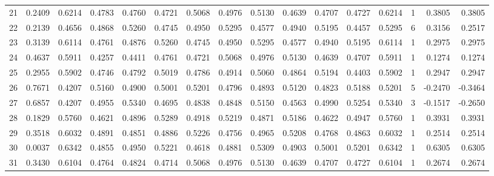 \begin{tabular}{lrrrrrrrrrrrrrrr}
21  &      0.2409 &  0.6214 &  0.4783 &  0.4760 &  0.4721 &  0.5068 &  0.4976 &  0.5130 &  0.4639 &  0.4707 &   0.4727 &     0.6214 &      1 &                    0.3805 &                     0.3805 \\
22  &      0.2139 &  0.4656 &  0.4868 &  0.5260 &  0.4745 &  0.4950 &  0.5295 &  0.4577 &  0.4940 &  0.5195 &   0.4457 &     0.5295 &      6 &                    0.3156 &                     0.2517 \\
23  &      0.3139 &  0.6114 &  0.4761 &  0.4876 &  0.5260 &  0.4745 &  0.4950 &  0.5295 &  0.4577 &  0.4940 &   0.5195 &     0.6114 &      1 &                    0.2975 &                     0.2975 \\
24  &      0.4637 &  0.5911 &  0.4257 &  0.4411 &  0.4761 &  0.4721 &  0.5068 &  0.4976 &  0.5130 &  0.4639 &   0.4707 &     0.5911 &      1 &                    0.1274 &                     0.1274 \\
25  &      0.2955 &  0.5902 &  0.4746 &  0.4792 &  0.5019 &  0.4786 &  0.4914 &  0.5060 &  0.4864 &  0.5194 &   0.4403 &     0.5902 &      1 &                    0.2947 &                     0.2947 \\
26  &      0.7671 &  0.4207 &  0.5160 &  0.4900 &  0.5001 &  0.5201 &  0.4796 &  0.4893 &  0.5120 &  0.4823 &   0.5188 &     0.5201 &      5 &                   -0.2470 &                    -0.3464 \\
27  &      0.6857 &  0.4207 &  0.4955 &  0.5340 &  0.4695 &  0.4838 &  0.4848 &  0.5150 &  0.4563 &  0.4990 &   0.5254 &     0.5340 &      3 &                   -0.1517 &                    -0.2650 \\
28  &      0.1829 &  0.5760 &  0.4621 &  0.4896 &  0.5289 &  0.4918 &  0.5219 &  0.4871 &  0.5186 &  0.4622 &   0.4947 &     0.5760 &      1 &                    0.3931 &                     0.3931 \\
29  &      0.3518 &  0.6032 &  0.4891 &  0.4851 &  0.4886 &  0.5226 &  0.4756 &  0.4965 &  0.5208 &  0.4768 &   0.4863 &     0.6032 &      1 &                    0.2514 &                     0.2514 \\
30  &      0.0037 &  0.6342 &  0.4855 &  0.4950 &  0.5221 &  0.4618 &  0.4881 &  0.5309 &  0.4903 &  0.5001 &   0.5201 &     0.6342 &      1 &                    0.6305 &                     0.6305 \\
31  &      0.3430 &  0.6104 &  0.4764 &  0.4824 &  0.4714 &  0.5068 &  0.4976 &  0.5130 &  0.4639 &  0.4707 &   0.4727 &     0.6104 &      1 &                    0.2674 &                     0.2674 \\

\end{tabular}
